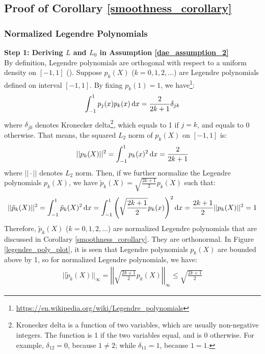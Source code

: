     \subsection{Proof of Corollary \ref{smoothness_corollary}}\label{proof_of_corollary}
        \subsubsection{Normalized Legendre Polynomials}\label{normalized_legendre}

        \textbf{Step 1: Deriving $L$ and $L_0$ in Assumption \ref{dae_assumption_2}}\\
        By definition, Legendre polynomials are orthogonal with respect to a uniform density on $[-1,1]$ (\cite{Hansen_2022}). Suppose $p_k(X)$ ($k=0,1,2,\ldots$) are Legendre polynomials defined on interval $[-1,1]$. By fixing $p_k(1)=1$, we have\footnote{\url{https://en.wikipedia.org/wiki/Legendre_polynomials}}:
        \begin{align*}
            \int_{-1}^1 p_j(x)p_k(x)\mathop{}\!\mathrm{d} x=\frac{2}{2k+1} \delta_{jk}
        \end{align*}
        where $\delta_{jk}$ denotes Kronecker delta\footnote{Kronecker delta is a function of two variables, which are usually non-negative integers. The function is 1 if the two variables equal, and is 0 otherwise. For example, $\delta_{12}=0$, because $1 \not= 2$; while $\delta_{11}=1$, because $1=1$.}, which equals to 1 if $j=k$, and equals to 0 otherwise. That means, the squared $L_2$ norm of $p_k(X)$ on $[-1,1]$ is:
        \begin{align*}
            ||p_k(X)||^2=\int_{-1}^1 p_k(x)^2 \mathop{}\!\mathrm{d} x = \frac{2}{2k+1}
        \end{align*}
        where $||\cdot||$ denotes $L_2$ norm. Then, if we further normalize the Legendre polynomials $p_k(X)$, we have $\tilde{p}_k(X)=\sqrt{\frac{2k+1}{2}}p_k(X)$ such that:
        \begin{align*}
            ||\tilde{p}_k(X)||^2=\int_{-1}^1 \tilde{p}_k(X)^2 \mathop{}\!\mathrm{d} x =\int_{-1}^1 \left(\sqrt{\frac{2k+1}{2}}p_k(x)\right)^2 \mathop{}\!\mathrm{d} x =\frac{2k+1}{2}||p_k(X)||^2=1
        \end{align*}
        Therefore, $\tilde{p}_k(X)$ ($k=0,1,2,\ldots$) are normalized Legendre polynomials that are discussed in Corollary \ref{smoothness_corollary}. They are orthonormal. In Figure \ref{legendre_poly_plot}, it is seen that Legendre polynomials $p_k(X)$ are bounded above by 1, so for normalized Legendre polynomials, we have:
        \begin{align*}
            ||\tilde{p}_k(X)||_{\infty}=\left|\left|\sqrt{\frac{2k+1}{2}}p_k(X)\right|\right|_{\infty} \le \sqrt{\frac{2k+1}{2}}
        \end{align*}
